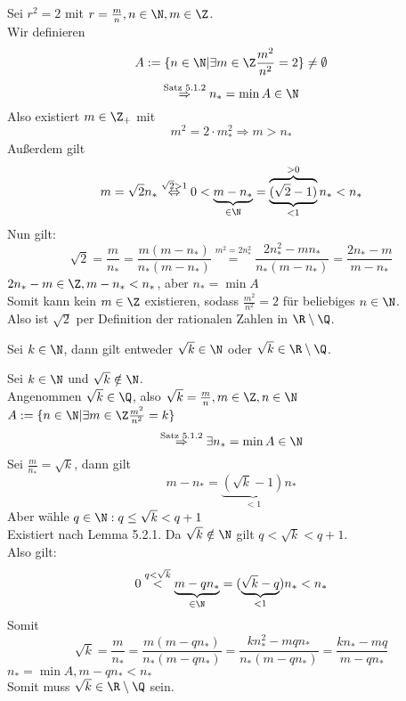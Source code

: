 \documentclass[../ana1.tex]{subfiles}
\begin{document}
\begin{bew}
	Sei \( r^2 = 2 \) mit \( r = \frac{m}{n}, n\in\N, m\in\Z \).\\
	Wir definieren 
	\[ A:= \{n\in\N|\exists m\in\Z \frac{m^2}{n^2}= 2\} \neq \emptyset \]
	\[ \overset{\text{Satz 5.1.2}}{\Rightarrow} n_* = \min A \in \N \]
	Also existiert \( m\in\Z_+ \) mit
	\[ m^2 = 2\cdot m_*^2 \Rightarrow m>n_* \]
	Außerdem gilt
	\[ m=\sqrt{2}n_* \overset{\sqrt{2}>1}{\Leftrightarrow} 0< \underbrace{m-n_*}_{\in\N} = \underbrace{\overbrace{(\sqrt{2} - 1)}}^{>0}_{<1} n_* < n_* \]
	Nun gilt: 
	\[ \sqrt{2} = \frac{m}{n_*} = \frac{m(m-n_*)}{n_*(m-n_*)} \overset{m^2=2n_*^2}{=} \frac{2n_*^2-mn_*}{n_*(m-n_*)} = \frac{2n_*-m}{m-n_*} \]
	\Lightning{} \(2n_* -m \in \Z, m-n_* < n_* \), aber \(n_* = \min A\) \\
	Somit kann kein \(m\in\Z \) existieren, sodass \(\frac{m^2}{n^2} = 2\) für beliebiges \(n\in\N \).\\
	Also ist \(\sqrt{2}\) per Definition der rationalen Zahlen in \(\R\setminus\Q \).
\end{bew}
\begin{satz}
	Sei \(k\in\N \), dann gilt entweder \(\sqrt{k}\in\N \) oder \(\sqrt{k}\in\R\setminus\Q \).
\end{satz}
\begin{bew}
	Sei \(k\in\N \) und \(\sqrt{k} \notin \N \).\\
	Angenommen \(\sqrt{k}\in\Q \), also \(\sqrt{k} = \frac{m}{n}, m\in\Z,n\in\N \) \\
	\(A:=\{n\in\N|\exists m\in\Z \frac{m^2}{n^2} = k\} \)
	\[ \overset{\text{Satz 5.1.2}}{\Rightarrow}\exists n_* = \min A \in \N \]
	Sei \(\frac{m}{n_*} = \sqrt{k}\), dann gilt
	\[ m-n_* = \underbrace{(\sqrt{k}-1)}_{<1} n_* \] %
	Aber wähle \(q\in\N: q\leq \sqrt{k} < q+1\) \\
	Existiert nach Lemma 5.2.1. Da \(\sqrt{k} \notin \N \) gilt \(q<\sqrt{k}<q+1\).\\
	Also gilt:
	\[ 0\overset{q<\sqrt{k}}{<} \underbrace{m-qn_*}_{\in\N} = (\underbrace{\sqrt{k}-q}_{<1})n_* < n_* \]
	Somit 
	\[ \sqrt{k} = \frac{m}{n_*} = \frac{m(m-qn_*)}{n_*(m-qn_*)} = \frac{kn_*^2 - mqn_*}{n_*(m-qn_*)}=\frac{kn_*-mq}{m-qn_*}\]
	\Lightning{} \(n_* = \min A, m-qn_* < n_*\) \\
	Somit muss \(\sqrt{k}\in\R\setminus\Q \) sein.
\end{bew}
\end{document}
